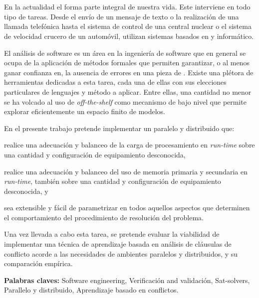 
\chapter*{\runtitulo}

En la actualidad el \soft forma parte integral de nuestra vida. Este interviene 
en todo tipo de tareas. Desde el envío de un mensaje de texto
o la realización de una llamada telefónica hasta el sistema de control de una
central nuclear o el sistema de velocidad crucero de un automóvil, utilizan sistemas basados en \hard y \soft
informático. 

El análisis de software es un área en la ingeniería de software que en general se ocupa de la aplicación de métodos formales que permiten garantizar, o al menos ganar confianza en, la ausencia de errores en una pieza de \soft. Existe una plétora de herramientas dedicadas a esta tarea, cada una de ellas con sus elecciones particulares de lenguajes y método a aplicar. Entre ellas, una cantidad no menor se ha volcado al uso de \ssolvers \emph{off-the-shelf} como mecanismo de bajo nivel que permite explorar eficientemente un espacio finito de modelos. 

En el presente trabajo pretende implementar un \ssolver paralelo y distribuido que:
\begin{inparaenum}[a)]  
\item realice una adecuación y balanceo de la carga de procesamiento en \emph{run-time} sobre una cantidad y configuración de equipamiento desconocida,
\item realice una adecuación y balanceo del uso de memoria primaria y secundaria en \emph{run-time}, también sobre una cantidad y configuración de equipamiento desconocida, y 
\item sea extensible y fácil de parametrizar en todos aquellos aspectos que determinen el comportamiento del procedimiento de resolución del problema. 
\end{inparaenum}
Una vez llevada a cabo esta tarea, se pretende evaluar la viabilidad de implementar una técnica de aprendizaje basada en análisis de cláusulas de conflicto acorde a las necesidades de ambientes paralelos y distribuidos, y su comparación empírica.

\bigskip

\noindent\textbf{Palabras claves:} Software engineering, Verificación and validación, Sat-solvers, Parallelo y distribuido, Aprendizaje basado en conflictos.